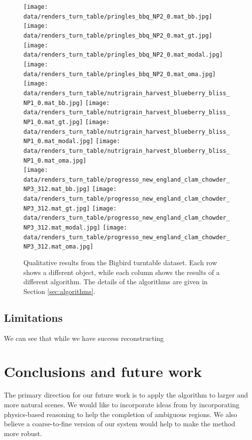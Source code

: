 \documentclass[10pt,twocolumn,letterpaper]{article}
\begin{document}
\begin{figure}
     \texttt{[image: data/renders\_turn\_table/pringles\_bbq\_NP2\_0.mat\_bb.jpg]}
     \texttt{[image: data/renders\_turn\_table/pringles\_bbq\_NP2\_0.mat\_gt.jpg]}
     \texttt{[image: data/renders\_turn\_table/pringles\_bbq\_NP2\_0.mat\_modal.jpg]}
     \texttt{[image: data/renders\_turn\_table/pringles\_bbq\_NP2\_0.mat\_oma.jpg]} \\
    \texttt{[image: data/renders\_turn\_table/nutrigrain\_harvest\_blueberry\_bliss\_NP1\_0.mat\_bb.jpg]}
     \texttt{[image: data/renders\_turn\_table/nutrigrain\_harvest\_blueberry\_bliss\_NP1\_0.mat\_gt.jpg]}
     \texttt{[image: data/renders\_turn\_table/nutrigrain\_harvest\_blueberry\_bliss\_NP1\_0.mat\_modal.jpg]}
     \texttt{[image: data/renders\_turn\_table/nutrigrain\_harvest\_blueberry\_bliss\_NP1\_0.mat\_oma.jpg]} \\
      \texttt{[image: data/renders\_turn\_table/progresso\_new\_england\_clam\_chowder\_NP3\_312.mat\_bb.jpg]}
     \texttt{[image: data/renders\_turn\_table/progresso\_new\_england\_clam\_chowder\_NP3\_312.mat\_gt.jpg]}
     \texttt{[image: data/renders\_turn\_table/progresso\_new\_england\_clam\_chowder\_NP3\_312.mat\_modal.jpg]}
     \texttt{[image: data/renders\_turn\_table/progresso\_new\_england\_clam\_chowder\_NP3\_312.mat\_oma.jpg]} 
     \caption{Qualitative results from the Bigbird turntable dataset. 
     Each row shows a different object, while each column shows the results of a different algorithm. 
     The details of the algorithms are given in Section \ref{sec:algorithms}.
     }
\end{figure}


\subsection{Limitations}
We can see that while we have success reconstructing 

\section{Conclusions and future work}
The primary direction for our future work is to apply the algorithm to larger and more natural scenes.
We would like to incorporate ideas from \cite{zheng-cvpr-2013, shao-siggraphasia-2014} by incorporating physics-based reasoning to help the completion of ambiguous regions.
We also believe a coarse-to-fine version of our system would help to make the method more robust.
\end{document}
